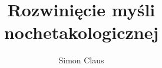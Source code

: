 

\title{Rozwinięcie myśli nochetakologicznej}
\author{Simon Claus}



\thispagestyle{empty}
\vspace*{\fill}
\begin{center}
    {\Huge \bfseries \thetitle \par}
    \vspace{2cm}
    
    {\Large \theauthor \par}
\end{center}
\vspace*{\fill}
\clearpage


















